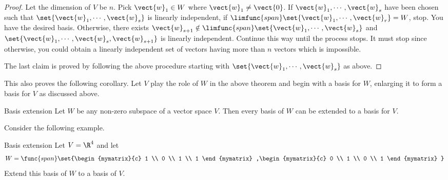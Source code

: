 \begin{proof}
Let the dimension of $V$ be $n$. Pick $\vect{w}_{1}\in W$
where $\vect{w}_{1}\neq \vect{0}$. If $\vect{w}_{1},\cdots ,\vect{w}_{s}$ have
been chosen such that $\set{\vect{w}_{1},\cdots ,\vect{w}_{s}} $ is
linearly independent, if $\limfunc{span}\set{\vect{w}_{1},\cdots ,\vect{w}
_{r}} =W$, stop. You have the desired basis. Otherwise, there exists $
\vect{w}_{s+1}\notin \limfunc{span}\set{\vect{w}_{1},\cdots ,\vect{w}
_{s}} $ and $\set{\vect{w}_{1},\cdots ,
\vect{w}_{s},\vect{w}_{s+1}} $ is linearly independent. Continue this
way until the process stops. It must stop since otherwise, you could obtain a
linearly independent set of vectors having more than $n$ vectors which is
impossible.

The last claim is proved by following the above procedure starting with $
\set{\vect{w}_{1},\cdots ,\vect{w}_{s}} $ as above. 
\end{proof}

This also proves the following corollary. Let $V$ play the role of $
W$ in the above theorem and begin with a basis for $W$, enlarging it to form
a basis for $V$ as discussed above.

\begin{corollary}{Basis extension}{}
Let $W$ be any non-zero subspace of a vector space $V$.
Then every basis of $W$ can be extended to a basis for $V$.
\end{corollary}

Consider the following example.

\begin{example}{Basis extension}{}
Let $V=\R^{4}$ and let 
\begin{equation*}
W=\func{span}\set{\begin{mymatrix}{c}
1 \\ 
0 \\ 
1 \\ 
1
\end{mymatrix} ,\begin{mymatrix}{c}
0 \\ 
1 \\ 
0 \\ 
1
\end{mymatrix} }
\end{equation*}
Extend this basis of $W$ to a basis of $V$.
\end{example}

